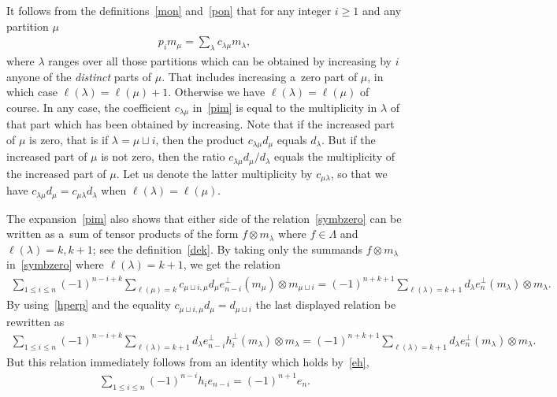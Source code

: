 It follows from the def\/initions~\eqref{mon} and~\eqref{pon} that for any integer $i\ge1$ and any
partition $\mu$
\begin{gather}\label{pim}
p_im_\mu=\sum_\lambda c_{\lambda\mu}m_\lambda,
\end{gather}
where $\lambda$ ranges over all those partitions which can be obtained by increasing by $i$ anyone of the
\emph{distinct} parts of $\mu$.
That includes increasing a~zero part of $\mu$, in which case $\ell(\lambda)=\ell(\mu)+1$.
Otherwise we have $\ell(\lambda)=\ell(\mu)$ of course.
In any case, the coef\/f\/icient $c_{\lambda\mu}$ in~\eqref{pim} is equal to the
multiplicity in $\lambda$ of that part which has been obtained by increasing.
Note that if the increased part of $\mu$ is zero, that is if $\lambda=\mu\sqcup i$, then
the product $c_{\lambda\mu}d_\mu$ equals $d_\lambda$.
But if the increased part of $\mu$ is not zero, then the ratio $
c_{\lambda\mu}d_\mu/ d_\lambda $ equals the multiplicity of
the increased part of $\mu$.
Let us denote the latter multiplicity by $c_{\mu\lambda}$, so that we have
$c_{\lambda\mu}d_\mu=c_{\mu\lambda}d_\lambda$ when
$\ell(\lambda)=\ell(\mu)$.

The expansion~\eqref{pim} also shows that either side of the relation~\eqref{symbzero} can be written as
a~sum of tensor products of the form $f\otimes m_\lambda$ where $f\in\Lambda$ and $\ell(\lambda)=k,k+1$;
see the def\/inition~\eqref{dek}.
By taking only the summands $f\otimes m_\lambda$ in~\eqref{symbzero} where
$\ell(\lambda)=k+1$, we get the relation
\begin{gather*}
\sum_{1\le i\le n}(-1)^{n-i+k}\sum_{\ell(\mu)=k}c_{\mu
\sqcup i,\mu}d_\mu e_{n-i}^{\perp}(m_\mu)\otimes m_{\mu\sqcup i}
=(-1)^{n+k+1}\sum_{\ell(\lambda)=k+1}d_\lambda e_n^{\perp}(m_\lambda)\otimes m_\lambda.
\end{gather*}
By using~\eqref{hperp} and the equality $ c_{\mu\sqcup
i,\mu}d_\mu=d_{\mu\sqcup i}
$ the last displayed relation be rewritten as
\begin{gather*}
\sum_{1\le i\le n}(-1)^{n-i+k}\sum_{\ell(\lambda)=k+1}d_\lambda e_{n-i}
^{\perp}h_i^{\perp}(
m_\lambda)\otimes m_\lambda=(-1)^{n+k+1}\sum_{\ell(\lambda)=k+1}
d_\lambda e_n^{\perp}(m_\lambda)\otimes m_\lambda.
\end{gather*}
But this relation immediately follows from an identity which holds by~\eqref{eh},
\begin{gather*}
\sum_{1\le i\le n}(-1)^{n-i}h_ie_{n-i}=(-1)^{n+1}e_n.
\end{gather*}


